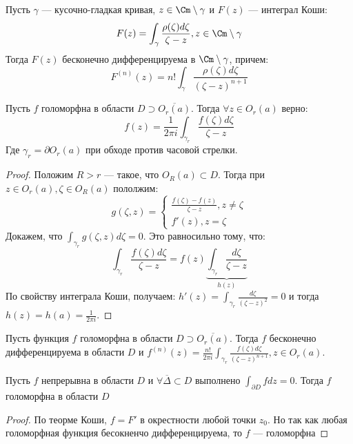 \begin{corollary}
    Пусть \(\gamma\) --- кусочно-гладкая кривая, \(z \in \Cm \setminus \gamma\) и \(F(z)\) --- интеграл Коши:
    \[F(z) = \int_\gamma \frac{\rho(\zeta)d\zeta}{\zeta - z}, z \in \Cm \setminus \gamma\]
    Тогда \(F(z)\) бесконечно дифференцируема в \(\Cm \setminus \gamma\), причем:
    \[F^{(n)}(z) = n!\int_{\gamma} \frac{\rho(\zeta)d\zeta}{(\zeta - z)^{n + 1}}\]
\end{corollary}

\begin{theorem}
    Пусть \(f\) голоморфна в области \(D \supset \overline{O_r(a)}\). Тогда \(\forall z \in O_r(a)\) верно:
    \[f(z) = \frac{1}{2\pi i} \int_{\gamma_r}\frac{f(\zeta)d\zeta}{\zeta - z}\]
    Где \(\gamma_r = \partial O_r(a)\) при обходе против часовой стрелки.
\end{theorem}
\begin{proof}
    Положим \(R > r\) --- такое, что \(O_R(a) \subset D\). Тогда при \(z \in O_r(a), \zeta \in O_R(a)\) пололжим:
    \[g(\zeta, z) = \left\{\begin{array}{l}
        \frac{f(\zeta) - f(z)}{\zeta - z}, z \ne \zeta \\
        f'(z), z = \zeta
    \end{array}\right.\]
    Докажем, что \(\int_{\gamma_r} g(\zeta, z)d\zeta = 0\). Это равносильно тому, что:
    \[\int_{\gamma_r} \frac{f(\zeta)d\zeta}{\zeta - z} = f(z)\underbrace{\int_{\gamma_r}\frac{d\zeta}{\zeta - z}}_{h(z)}\]
    По свойству интеграла Коши, получаем: \(h'(z) = \int_{\gamma_r}\frac{d\zeta}{(\zeta - z)^2} = 0\) и тогда \(h(z) = h(a) = \frac{1}{2\pi i}\).
\end{proof}

\begin{corollary}
    Пусть функция \(f\) голоморфна в области \(D \supset \overline{O_r(a)}\). Тогда \(f\) бесконечно дифференцируема в области \(D\) и \(f^{(n)}(z) = \frac{n!}{2\pi i}\int_{\gamma_r}\frac{f(\zeta)d\zeta}{(\zeta - z)^{n + 1}}, z \in O_r(a)\).
\end{corollary}

\begin{theorem}[Мореры]
    Пусть \(f\) непрерывна в области \(D\) и \(\forall \overline{\Delta} \subset D\) выполнено \(\int_{\partial D}fdz = 0\). Тогда \(f\) голоморфна в области \(D\)
\end{theorem}
\begin{proof}
    По теорме Коши, \(f = F'\) в окрестности любой точки \(z_0\). Но так как любая голоморфная функция бесокненчо дифференцируема, то \(f\) --- голоморфна
\end{proof}

